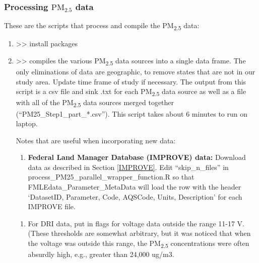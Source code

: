 
\subsubsection{Processing $\textrm{PM}_{2.5}$ data}

These are the scripts that process and compile the PM\textsubscript{2.5} data:
\begin{enumerate}[nolistsep]
\item {} >> install packages

\item {} >> compiles the various PM\textsubscript{2.5} data sources into a single data frame. The only eliminations of data are geographic, to remove states that are not in our study area. Update time frame of study if necessary. The output from this script is a csv file and sink .txt for each  PM\textsubscript{2.5} data source as well as a file with all of the PM\textsubscript{2.5} data sources merged together (``PM25\_Step1\_part\_*.csv''). This script takes about 6 minutes to run on laptop.

Notes that are useful when incorporating new data:
\begin{enumerate}
\item \textbf{Federal Land Manager Database (IMPROVE) data:} Download data as described in Section \ref{IMPROVE}. Edit ``skip\_n\_files'' in process\_PM25\_parallel\_wrapper\_function.R so that FMLEdata\_Parameter\_MetaData will load the row with the header `DatasetID, Parameter, Code, AQSCode, Units, Description' for each IMPROVE file.


\end{enumerate}

	\begin{enumerate}
	\item For DRI data, put in flags for voltage data outside the range 11-17 V. (These thresholds are somewhat arbitrary, but it was noticed that when the voltage was outside this range, the PM\textsubscript{2.5} concentrations were often absurdly high, e.g., greater than 24,000 ug/m3.
	\end{enumerate}


\end{enumerate}
